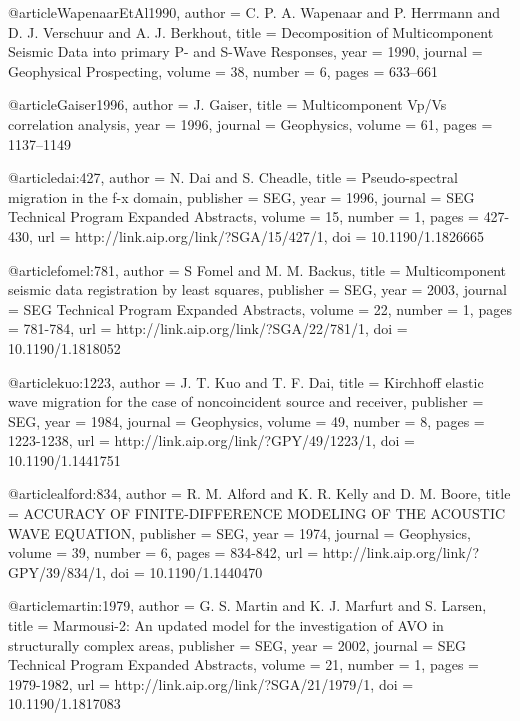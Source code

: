 @article{WapenaarEtAl1990,
  author =	 {C. P. A. Wapenaar and P. Herrmann and
                  D. J. Verschuur and A. J. Berkhout},
  title =	 {Decomposition of Multicomponent Seismic Data into
                  primary {P}- and {S}-Wave Responses},
  year =	 1990,
  journal =	 {Geophysical Prospecting},
  volume =	 38,
  number =	 6,
  pages =	 {633--661}
}

@article{Gaiser1996,
  author =	 {J. Gaiser},
  title =	 {Multicomponent {V}p/{V}s correlation analysis},
  year =	 1996,
  journal =	 {Geophysics},
  volume =	 61,
  pages =	 {1137--1149}
}

@article{dai:427,
  author =	 {N. Dai and S. Cheadle},
  title =	 {Pseudo-spectral migration in the f-x domain},
  publisher =	 {SEG},
  year =	 1996,
  journal =	 {SEG Technical Program Expanded Abstracts},
  volume =	 15,
  number =	 1,
  pages =	 {427-430},
  url =		 {http://link.aip.org/link/?SGA/15/427/1},
  doi =		 {10.1190/1.1826665}
}

@article{fomel:781,
  author =	 {S Fomel and M. M. Backus},
  title =	 {Multicomponent seismic data registration by least
                  squares},
  publisher =	 {SEG},
  year =	 2003,
  journal =	 {SEG Technical Program Expanded Abstracts},
  volume =	 22,
  number =	 1,
  pages =	 {781-784},
  url =		 {http://link.aip.org/link/?SGA/22/781/1},
  doi =		 {10.1190/1.1818052}
}

@article{kuo:1223,
  author =	 {J. T. Kuo and T. F. Dai},
  title =	 {Kirchhoff elastic wave migration for the case of
                  noncoincident source and receiver},
  publisher =	 {SEG},
  year =	 1984,
  journal =	 {Geophysics},
  volume =	 49,
  number =	 8,
  pages =	 {1223-1238},
  url =		 {http://link.aip.org/link/?GPY/49/1223/1},
  doi =		 {10.1190/1.1441751}
}

@article{alford:834,
  author =	 {R. M. Alford and K. R. Kelly and D. M. Boore},
  title =	 {ACCURACY OF FINITE-DIFFERENCE MODELING OF THE
                  ACOUSTIC WAVE EQUATION},
  publisher =	 {SEG},
  year =	 1974,
  journal =	 {Geophysics},
  volume =	 39,
  number =	 6,
  pages =	 {834-842},
  url =		 {http://link.aip.org/link/?GPY/39/834/1},
  doi =		 {10.1190/1.1440470}
}

@article{martin:1979,
  author =	 {G. S. Martin and K. J. Marfurt and S. Larsen},
  title =	 {Marmousi-2: An updated model for the investigation
                  of AVO in structurally complex areas},
  publisher =	 {SEG},
  year =	 2002,
  journal =	 {SEG Technical Program Expanded Abstracts},
  volume =	 21,
  number =	 1,
  pages =	 {1979-1982},
  url =		 {http://link.aip.org/link/?SGA/21/1979/1},
  doi =		 {10.1190/1.1817083}
}

